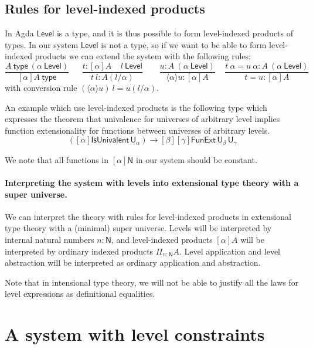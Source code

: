 \documentclass[11pt,a4paper]{article}
\newcommand{\lam}[2]{{\langle}#1{\rangle}#2}
\def\NN{\mathsf{N}}
\def\UU{\mathsf{U}}
\def\Level{\mathsf{Level}}
\newcommand{\type}{\mathsf{type}}
\begin{document}
\subsection*{Rules for level-indexed products}

In Agda $\Level$ is a type, and it is thus possible to form level-indexed products of types. In our system $\Level$ is not a type, so if we want to be able to form level-indexed products we can extend the system with the following rules:
$$
\frac{A~\type~(\alpha~\Level)}{[\alpha]A~\type}~~~~~~~
\frac{t:[\alpha]A~~~~~l~\Level}
     {t~l:A(l/\alpha)}~~~~~~~~~
\frac{u:A~(\alpha~\Level)}{\lam{\alpha}{u}: [\alpha]A}~~~~~
\frac{t~\alpha = u~\alpha:A~(\alpha~\Level)}{t = u:[\alpha]A}
$$
with conversion rule $(\lam{\alpha}{u})~l = u(l/\alpha)$.

An example which use level-indexed products is the following type which  expresses the theorem that univalence for universes of arbitrary level implies function extensionality for functions between universes of arbitrary levels.
$$
([\alpha]\mathsf{IsUnivalent}\, \UU_\alpha)
\to [\beta][\gamma] \mathsf{FunExt}\, \UU_\beta\, \UU_\gamma
$$   
               
We note that all functions in $[\alpha]\NN$ in our system
should be constant. 

\paragraph{Interpreting the system with levels into extensional type theory with a super universe.} We can interpret the theory with rules for level-indexed products in extensional type theory with a (minimal) super universe. Levels will be interpreted by internal natural numbers $n : \NN$, and level-indexed products $[\alpha]A$ will be interpreted by ordinary indexed products $\Pi_{n : \NN}A$. Level application and level abstraction will be interpreted as ordinary application and abstraction.

Note that in intensional type theory, we will not be able to justify all the laws for level expressions as definitional equalities.

\section{A system with level constraints}\label{constraints}
\end{document}
